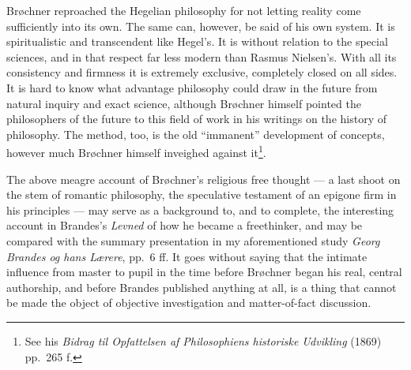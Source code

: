 \documentclass[12pt,a4paper,openany]{book}
\begin{document}
Brøchner reproached the Hegelian philosophy for not letting reality come sufficiently into its own. The same can,
however, be said of his own system. It is spiritualistic and transcendent like Hegel's. It is without relation to
the special sciences, and in that respect far less modern than Rasmus Nielsen's. With all its consistency and
firmness it is extremely exclusive, completely closed on all sides. It is hard to know what advantage philosophy
could draw in the future from natural inquiry and exact science, although Brøchner himself pointed the philosophers
of the future to this field of work in his writings on the history of philosophy. The method, too, is the old
``immanent'' development of concepts, however much Brøchner himself inveighed against
it\footnote{See his \textit{Bidrag til Opfattelsen af Philosophiens historiske Udvikling} (1869) pp.~265 f.}.

The above meagre account of Brøchner's religious free thought --- a last shoot on the stem of romantic philosophy,
the speculative testament of an epigone firm in his principles --- may serve as a background to, and to complete,
the interesting account in Brandes's \textit{Levned} of how he became a freethinker, and may be compared with the
summary presentation in my aforementioned study \textit{Georg Brandes og hans Lærere}, pp.~6 ff. It goes without
saying that the intimate influence from master to pupil in the time before Brøchner began his real, central
authorship, and before Brandes published anything at all, is a thing that cannot be made the object of objective
investigation and matter-of-fact discussion.
\end{document}
